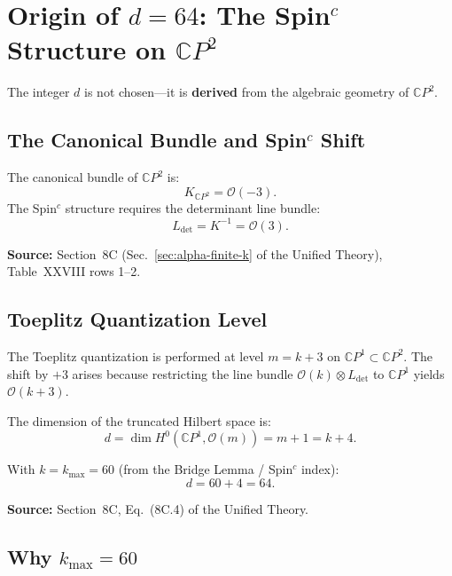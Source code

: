 \documentclass[12pt,a4paper]{article}
\begin{document}
\section{Origin of $d = 64$: The Spin$^c$ Structure on $\mathbb{C}P^2$}
\label{sec:origin-d}

The integer $d$ is not chosen---it is \textbf{derived} from the algebraic
geometry of $\mathbb{C}P^2$.

\subsection{The Canonical Bundle and Spin$^c$ Shift}

The canonical bundle of $\mathbb{C}P^2$ is:
\begin{equation}
K_{\mathbb{C}P^2} = \mathcal{O}(-3).
\end{equation}
The Spin$^c$ structure requires the determinant line bundle:
\begin{equation}
L_{\det} = K^{-1} = \mathcal{O}(3).
\end{equation}

\textbf{Source:} Section~8C (Sec.~\ref*{sec:alpha-finite-k} of the Unified Theory),
Table~XXVIII rows 1--2.

\subsection{Toeplitz Quantization Level}

The Toeplitz quantization is performed at level $m = k + 3$ on
$\mathbb{C}P^1 \subset \mathbb{C}P^2$. The shift by $+3$ arises because
restricting the line bundle $\mathcal{O}(k) \otimes L_{\det}$ to
$\mathbb{C}P^1$ yields $\mathcal{O}(k+3)$.

The dimension of the truncated Hilbert space is:
\begin{equation}
\boxed{d = \dim H^0(\mathbb{C}P^1, \mathcal{O}(m)) = m + 1 = k + 4.}
\end{equation}

With $k = k_{\max} = 60$ (from the Bridge Lemma / Spin$^c$ index):
\begin{equation}
d = 60 + 4 = 64.
\end{equation}

\textbf{Source:} Section~8C, Eq.~(8C.4) of the Unified Theory.

\subsection{Why $k_{\max} = 60$}
\end{document}
